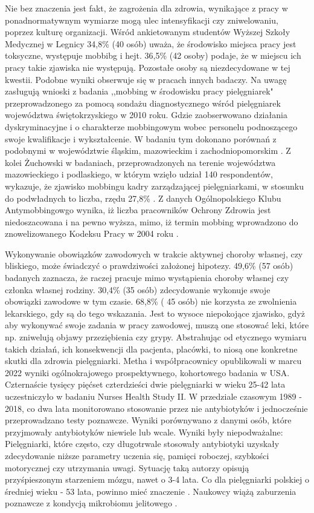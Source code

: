 \documentclass[a4paper,12pt,twoside,openany]{report}
\begin{document}
Nie bez znaczenia jest fakt, że zagrożenia  dla zdrowia, wynikające z pracy w ponadnormatywnym wymiarze mogą ulec intensyfikacji czy zniwelowaniu, poprzez kulturę organizacji. Wśród ankietowanym studentów Wyższej Szkoły Medycznej w Legnicy 34,8\% (40 osób) uważa, że środowisko miejsca pracy jest toksyczne, występuje mobbibg i hejt. 36,5\% (42 osoby) podaje, że w miejscu ich pracy takie zjawiska nie występują. Pozostałe osoby są niezdecydowane w tej kwestii.  Podobne wyniki obserwuje się w pracach innych badaczy. Na uwagę zasługują wnioski z badania ,,mobbing w środowisku pracy pielęgniarek" przeprowadzonego za pomocą sondażu diagnostycznego wśród pielęgniarek województwa świętokrzyskiego w 2010 roku. Gdzie zaobserwowano działania dyskryminacyjne i o charakterze mobbingowym wobec personelu podnoszącego swoje kwalifikacje i wykształcenie. W badaniu tym dokonano porównań z podobnymi w województwie śląskim, mazowieckim i zachodniopomorskim \cite{mobbing}. Z kolei Żuchowski w badaniach, przeprowadzonych na terenie województwa mazowieckiego i podlaskiego, w którym wzięło udział 140 respondentów, wykazuje, że zjawisko mobbingu kadry zarządzającej pielęgniarkami, w stosunku do podwładnych to liczba, rzędu 27,8\% \cite{żuchowski}. Z danych Ogólnopolskiego Klubu Antymobbingowgo wynika, iż liczba pracowników Ochrony Zdrowia jest niedoszacowana i na pewno wyższa\cite{grabowski}, mimo, iż termin mobbing wprowadzono do znowelizowanego Kodeksu Pracy w 2004 roku \cite{kodeks}.


Wykonywanie obowiązków zawodowych w trakcie aktywnej choroby własnej, czy bliskiego, może świadczyć o prawdziwości założonej hipotezy. 49,6\%  (57 osób) badanych zaznacza, że raczej pracuje mimo wystąpienia choroby własnej czy członka własnej rodziny. 30,4\%  (35 osób) zdecydowanie wykonuje swoje obowiązki zawodowe w tym czasie. 68,8\% ( 45 osób) nie korzysta ze zwolnienia lekarskiego, gdy są do tego wskazania. Jest to wysoce niepokojące zjawisko, gdyż aby wykonywać swoje zadania w pracy zawodowej, muszą one stosować leki, które np. zniwelują objawy przeziębienia czy grypy. Abstrahując od etycznego wymiaru takich działań,  ich konsekwencji dla pacjenta, placówki, to niosą one konkretne skutki dla zdrowia pielęgniarki. Metha i współpracownicy opublikowali w marcu 2022 wyniki ogólnokrajowego prospektywnego, kohortowego badania  w USA. Czternaście tysięcy pięćset czterdzieści dwie  pielęgniarki w wieku 25-42 lata uczestniczyło w badaniu Nurses Health Study II. W przedziale czasowym 1989 - 2018, co dwa lata monitorowano stosowanie przez nie antybiotyków i jednocześnie przeprowadzano testy poznawcze. Wyniki porównywano z danymi osób, które przyjmowały antybiotyków niewiele lub wcale. Wyniki były niepodważalne: Pielęgniarki, które często, czy długotrwale stosowały antybiotyki uzyskały zdecydowanie niższe parametry uczenia się, pamięci roboczej, szybkości motorycznej czy utrzymania uwagi. Sytuację taką autorzy opisują przyśpieszonym starzeniem mózgu, nawet o 3-4 lata.  Co dla  pielęgniarki polskiej o średniej wieku - 53 lata, powinno mieć znaczenie \cite{statystyka}.  Naukowcy  wiążą zaburzenia poznawcze z  kondycją mikrobiomu jelitowego \cite{metha}.
\end{document}
